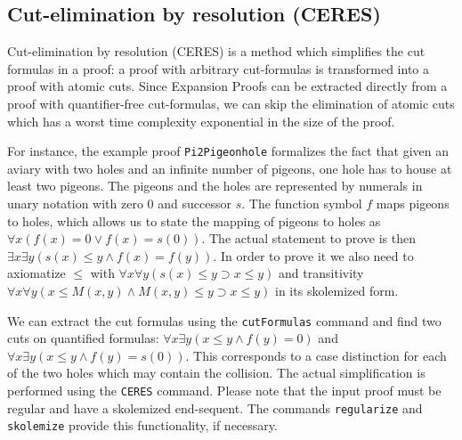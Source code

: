\documentclass[a4paper,11pt]{article}
\newcommand{\impl}{\supset} %
\renewcommand{\land}{\wedge}
\renewcommand{\lor}{\vee}
\begin{document}
\subsection{Cut-elimination by resolution (CERES)}\label{sec:ceres}

Cut-elimination by resolution (CERES) is a method which simplifies the cut
 formulas in a proof: a proof with arbitrary cut-formulas is transformed
 into a proof with atomic cuts. Since Expansion Proofs can be extracted
 directly from a proof with quantifier-free cut-formulas, we can skip
 the elimination of atomic cuts which has a worst time complexity
 exponential in the size of the proof.

For instance, the example proof \texttt{Pi2Pigeonhole} formalizes
 the fact that given an aviary with two holes and an infinite number
 of pigeons, one hole has to house at least two pigeons. The pigeons and
 the holes are represented by numerals in unary notation with zero $0$ and
 successor $s$. The function symbol $f$ maps pigeons to holes, which allows us
 to state the mapping of pigeons to holes as
 $\forall x (f(x) = 0 \lor f(x) = s(0))$. The actual statement to prove is then
 $\exists x \exists y (s(x) \leq y \land f(x) = f(y))$. In order to prove it
 we also need to axiomatize $\leq$ with
 $\forall x \forall y (s(x) \leq y \impl x \leq y)$ and transitivity
 $\forall x \forall y (x \leq M(x,y) \land M(x,y) \leq y \impl x \leq y)$ in its
 skolemized form.

We can extract the cut formulas using the \texttt{cutFormulas} command and find two
 cuts on quantified formulas: $\forall x \exists y (x \leq y \land f(y) = 0)$
 and $\forall x \exists y (x \leq y \land f(y) = s(0))$. This corresponds to a
 case distinction for each of the two holes which may contain the collision.
The actual simplification is performed using the \texttt{CERES} command. Please note
 that the input proof must be regular and have a skolemized end-sequent. The
 commands \texttt{regularize} and \texttt{skolemize} provide this functionality,
 if necessary.
\end{document}
